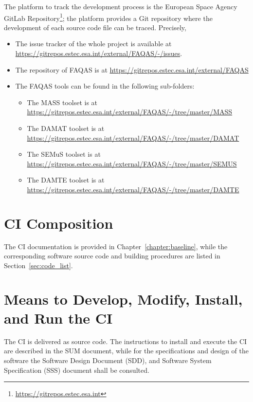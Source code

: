 The platform to track the development process is the European Space Agency GitLab Repository\footnote{\url{https://gitrepos.estec.esa.int}}; the platform provides a Git repository where the development of each source code file can be traced. Precisely,
\STARTCHANGEDFINAL
\begin{itemize}
\item The issue tracker of the whole project is available at \url{https://gitrepos.estec.esa.int/external/FAQAS/-/issues}.
\item The repository of FAQAS is at \url{https://gitrepos.estec.esa.int/external/FAQAS}
\item The FAQAS tools can be found in the following sub-folders:
\begin{itemize}
    \item The MASS toolset is at \url{https://gitrepos.estec.esa.int/external/FAQAS/-/tree/master/MASS}
    \item The DAMAT toolset is at \url{https://gitrepos.estec.esa.int/external/FAQAS/-/tree/master/DAMAT}
    \item The SEMuS toolset is at \url{https://gitrepos.estec.esa.int/external/FAQAS/-/tree/master/SEMUS}
    \item The DAMTE toolset is at \url{https://gitrepos.estec.esa.int/external/FAQAS/-/tree/master/DAMTE}
\end{itemize}
\end{itemize}
\ENDCHANGEDFINAL

\section{CI Composition}

The CI documentation is provided in Chapter~\ref{chapter:baseline}, while the corresponding software source code and building procedures are listed in Section~\ref{sec:code_list}.

\section{Means to Develop, Modify, Install, and Run the CI}

The CI is delivered as source code. The instructions to install and execute the CI are described in the SUM document, while for the specifications and design of the software the Software Design Document (SDD), and Software System Specification (SSS) document shall be consulted.

